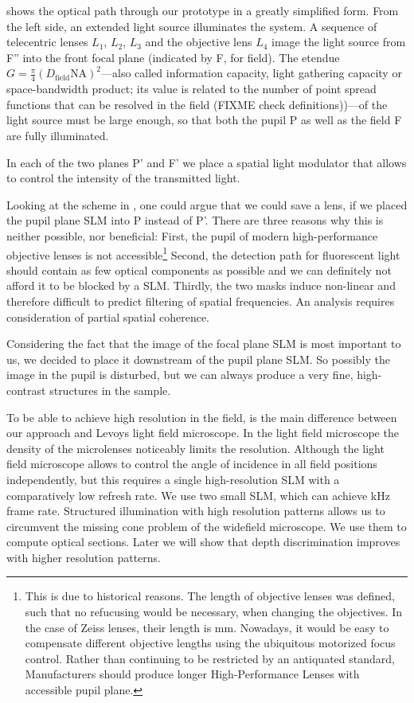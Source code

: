  shows the optical path through our prototype
in a greatly simplified form.  From the left side, an extended light
source illuminates the system. A sequence of telecentric lenses $L_1$,
$L_2$, $L_3$ and the objective lens $L_4$ image the light source from
F'' into the front focal plane (indicated by F, for field). The
etendue $G=\frac{\pi}{4}(D_\textrm{field}\textrm{NA})^2$---also called
information capacity, light gathering capacity or space-bandwidth
product; its value is related to the number of point spread functions
that can be resolved in the field (FIXME check definitions))---of the
light source must be large enough, so that both the pupil P as well as
the field F are fully illuminated.

In each of the two planes P' and F' we place a spatial light modulator
that allows to control the intensity of the transmitted light.

Looking at the scheme in , one could argue
that we could save a lens, if we placed the pupil plane SLM into P
instead of P'. There are three reasons why this is neither possible,
nor beneficial: First, the pupil of modern high-performance objective
lenses is not accessible\footnote{This is due to historical reasons.
  The length of objective lenses was defined, such that no refucusing
  would be necessary, when changing the objectives. In the case of
  Zeiss lenses, their length is \unit[45]{mm}. Nowadays, it would be
  easy to compensate different objective lengths using the ubiquitous
  motorized focus control.  Rather than continuing to be restricted by
  an antiquated standard, Manufacturers should produce longer
  High-Performance Lenses with accessible pupil plane.}  Second, the
detection path for fluorescent light should contain as few optical
components as possible and we can definitely not afford it to be
blocked by a SLM.  Thirdly, the two masks induce non-linear and
therefore difficult to predict filtering of spatial frequencies. An
analysis requires consideration of partial spatial coherence.

Considering the fact that the image of the focal plane SLM is most
important to us, we decided to place it downstream of the pupil plane
SLM. So possibly the image in the pupil is disturbed, but we can
always produce a very fine, high-contrast structures in the sample.

To be able to achieve high resolution in the field, is the main
difference between our approach and Levoys light field microscope.  In
the light field microscope the density of the microlenses noticeably
limits the resolution. Although the light field microscope allows to
control the angle of incidence in all field positions independently,
but this requires a single high-resolution SLM with a comparatively
low refresh rate. We use two small SLM, which can achieve
\unit[1]{kHz} frame rate. Structured illumination with high resolution
patterns allows us to circumvent the missing cone problem of the
widefield microscope. We use them to compute optical sections. Later
we will show that depth discrimination improves with higher resolution
patterns.
